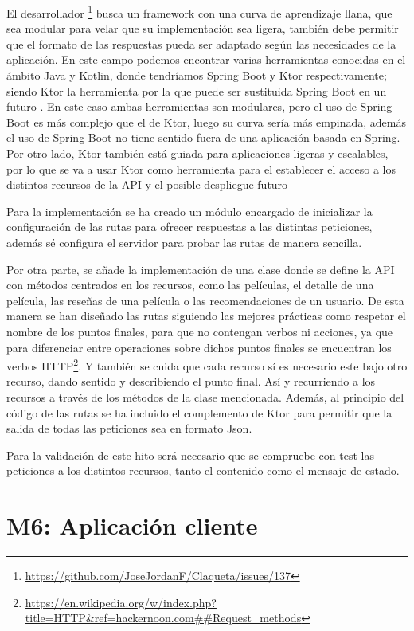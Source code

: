 El desarrollador \footnote{\url{https://github.com/JoseJordanF/Claqueta/issues/137}} busca un framework con una
curva de aprendizaje llana, que sea modular\cite{modularSoft} para velar que su implementación sea ligera, 
también debe permitir que el formato de las respuestas pueda ser adaptado según las necesidades de la aplicación.
En este campo podemos encontrar varias herramientas conocidas en el ámbito Java y Kotlin, donde tendríamos Spring 
Boot y Ktor respectivamente; siendo Ktor la herramienta por la que puede ser sustituida Spring Boot en un futuro 
\cite{ktorVSsboot}. En este caso ambas herramientas son modulares, pero el uso de Spring Boot es más complejo que el 
de Ktor, luego su curva sería más empinada, además el uso de Spring Boot no tiene sentido fuera de una aplicación 
basada en Spring\cite{springFrameW}. Por otro lado, Ktor también está guiada para aplicaciones ligeras y escalables, 
por lo que se va a usar Ktor como herramienta para el establecer el acceso a los distintos recursos de la API y el 
posible despliegue futuro

Para la implementación se ha creado un módulo encargado de inicializar la configuración de las rutas para 
ofrecer respuestas a las distintas peticiones, además sé configura el servidor para probar las rutas de 
manera sencilla. 

Por otra parte, se añade la implementación de una clase donde se define la API con métodos centrados en los recursos,
como las películas, el detalle de una película, las reseñas de una película o las recomendaciones de un usuario. De
esta manera se han diseñado las rutas siguiendo las mejores prácticas \cite{RestPract} como respetar el nombre de los 
puntos finales, para que no contengan verbos ni acciones, ya que para diferenciar entre operaciones sobre dichos 
puntos finales se encuentran los verbos HTTP\footnote{\url{https://en.wikipedia.org/w/index.php?title=HTTP&ref=hackernoon.com##Request_methods}}. 
Y también se cuida que cada recurso sí es necesario este bajo otro recurso, dando sentido y describiendo el punto 
final.  Así y recurriendo a los recursos a través de los métodos de la clase mencionada. Además, al principio del 
código de las rutas se ha incluido el complemento de Ktor para permitir que la salida de todas las peticiones sea en 
formato Json.

Para la validación de este hito será necesario que se compruebe con test las peticiones a los distintos recursos, 
tanto el contenido como el mensaje de estado.

\section{M6: Aplicación cliente}

